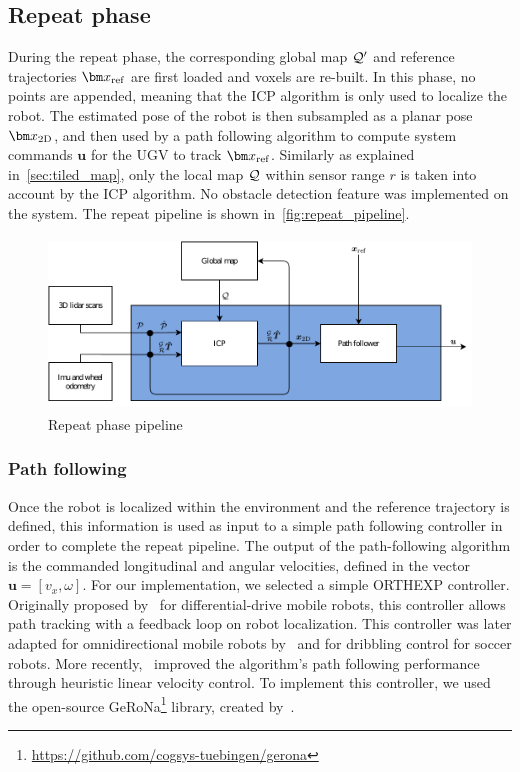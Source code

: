 \subsection{Repeat phase}
\label{sec:repeat_phase}

During the repeat phase, the corresponding global map $\mathcal{Q}'$ and reference trajectories $\reftraj$ are first loaded and voxels are re-built.
In this phase, no points are appended, meaning that the \ac{ICP} algorithm is only used to localize the robot.
The estimated pose of the robot \transform{\robotf}{\mapf} is then subsampled as a planar pose $\poseplane$, and then used by a path following algorithm to compute system commands $\bm u$ for the \ac{UGV} to track $\reftraj$.
Similarly as explained in~\autoref{sec:tiled_map}, only the local map $\mathcal{Q}$ within sensor range $r$ is taken into account by the \ac{ICP} algorithm.
No obstacle detection feature was implemented on the system.
The repeat pipeline is shown in~\autoref{fig:repeat_pipeline}.

\begin{figure} [htpb]
	\centering
	\includegraphics[height=1.8in]{figs/repeat_pipeline/repeat_pipeline.pdf}
	\caption{Repeat phase pipeline}
	\label{fig:repeat_pipeline}
\end{figure}

\subsubsection{Path following}
\label{sec:orthexp}


Once the robot is localized within the environment and the reference trajectory is defined, this information is used as input to a simple path following controller in order to complete the repeat pipeline.
The output of the path-following algorithm is the commanded longitudinal and angular velocities, defined in the vector $\bm u = [v_x, \omega]$.
For our implementation, we selected a simple \ac{ORTHEXP} controller.
Originally proposed by~\citet{Mojaev2004} for differential-drive mobile robots, this controller allows path tracking with a feedback loop on robot localization.
This controller was later adapted for omnidirectional mobile robots by~\citet{Li2007} and for dribbling control for soccer robots.
More recently,~\citet{Huskic2017} improved the algorithm's path following performance through heuristic linear velocity control.
To implement this controller, we used the open-source \ac{GeRoNa}\footnote{\url{https://github.com/cogsys-tuebingen/gerona}} library, created by~\citet{Huskic2019}.

